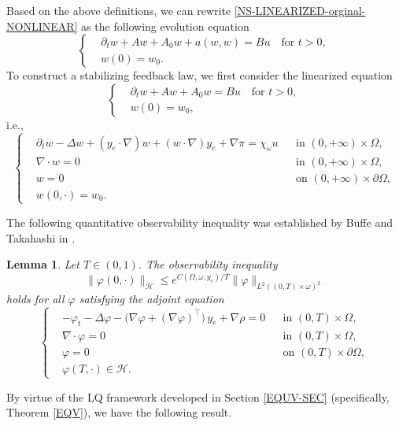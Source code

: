 \documentclass[a4paper]{article}
\newtheorem{lemma}[theorem]{Lemma}
\numberwithin{equation}{section}
\begin{document}
Based on the above definitions, we can rewrite \eqref{NS-LINEARIZED-orginal-NONLINEAR} as the following evolution equation
\begin{equation}\label{NS-PERTURB-ABS}
\left\{\begin{aligned}
&\partial_t w+Aw+A_0w+a(w,w)=Bu\quad \text{for }t>0,\\
&w(0)=w_0.
\end{aligned}\right.
\end{equation}
To construct a stabilizing feedback law, we first consider the linearized equation
\begin{equation}\label{NS-LINEARIZED-ABS-original}
\left\{\begin{aligned}
&\partial_t w+Aw+A_0w=Bu\quad \text{for }t>0,\\
&w(0)=w_0,
\end{aligned}\right.
\end{equation}
i.e.,
\begin{equation}\label{NS-LINEARIZED-orginal}
\left\{\begin{aligned}
&\partial_tw-\Delta w +(y_e\cdot\nabla)w +(w\cdot\nabla)y_e +\nabla \pi = \chi_\omega u&& \text{in } (0,+\infty)\times \Omega,\\
&\nabla\cdot w =0&& \text{in } (0,+\infty)\times \Omega,\\
&w=0&& \text{on } (0,+\infty)\times \partial\Omega,\\
&w(0,\cdot)=w_0.
\end{aligned}\right.
\end{equation}

The following quantitative observability inequality was established by Buffe and Takahashi in \cite{BT}.
\begin{lemma}\label{NS-OBS-BT-523}
Let $T\in (0,1)$. The observability inequality 
\begin{equation}\label{NS-OBS-523}
\|\varphi(0,\cdot)\|_{\mathcal H} \le e^{C(\Omega,\omega,y_e)/T} \|\varphi\|_{L^2((0,T)\times \omega)^2}
\end{equation}
holds for all $\varphi$ satisfying the adjoint equation
\begin{equation}\label{NS-ADJ}
\left\{\begin{aligned}
&-\varphi_t-\Delta\varphi-\bigl(\nabla\varphi+(\nabla\varphi)^\top\bigr)\,y_e+\nabla\rho=0&&\text{in }(0,T)\times \Omega,\\
&\nabla\cdot\varphi=0&&\text{in } (0,T)\times \Omega,\\
&\varphi=0&&\text{on }(0,T)\times \partial\Omega,\\
&\varphi(T,\cdot)\in \mathcal H.
\end{aligned}\right.
\end{equation}
\end{lemma}
By virtue of the LQ framework developed in Section \ref{EQUV-SEC} (specifically, Theorem \ref{EQV}), we have the following result.
\end{document}
